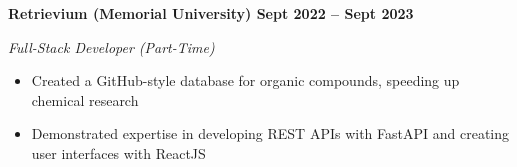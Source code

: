 \vspace{0.1cm}
\textbf{Retrievium (Memorial University) \hfill Sept 2022 -- Sept 2023} \par
\textit{Full-Stack Developer (Part-Time)} \par
\begin{itemize}
    \item Created a GitHub-style database for organic compounds, speeding up chemical research
    \item Demonstrated expertise in developing REST APIs with FastAPI and creating user interfaces with ReactJS
\end{itemize} \par